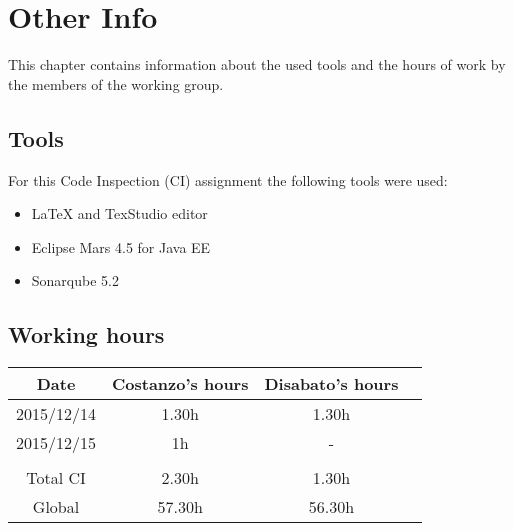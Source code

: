 \documentclass[\mainpath/main]{subfiles}
\begin{document}
\chapter{Other Info}
\label{OtherInfo}

\setmyfancystyle

This chapter contains information about the used tools and the hours of work by the members of the working group.

\section{Tools}
For this Code Inspection (CI) assignment the following tools were used:
\begin{itemize}
	\item \LaTeX{} and TexStudio editor
	\item Eclipse Mars 4.5 for Java EE
	\item Sonarqube 5.2
\end{itemize}

\section{Working hours}
\begin{table}[h!]
	\centering
\begin{tabular}{cccc}
\hline
Date       & Costanzo's hours & Disabato's hours  & \\ \hline
2015/12/14 & 1.30h 			  & 1.30h 			  & \\ \hline
2015/12/15 & 1h 			  & - 				  & \\ \hline 
\\
Total CI   & 2.30h 		      & 1.30h 			  & \\ \hline
Global 	   & 57.30h 		  & 56.30h 			  & \\ \hline

\end{tabular}
\end{table}
\end{document}
